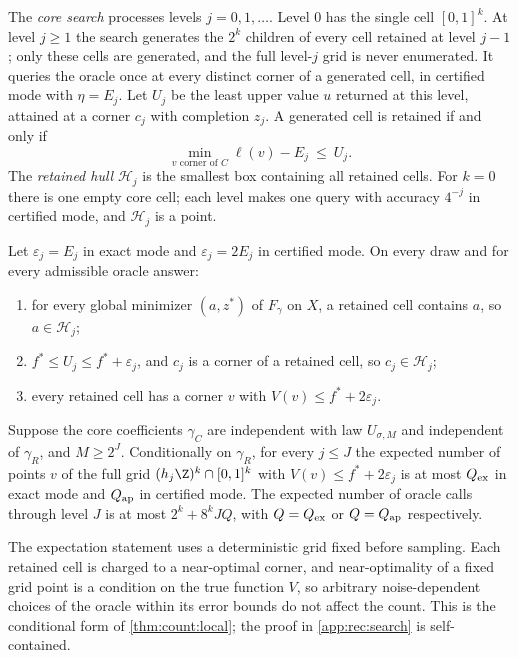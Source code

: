 The \emph{core search} processes levels $j=0,1,\ldots$. Level $0$ has the
single cell $[0,1]^k$. At level $j\ge1$ the search generates the $2^k$
children of every cell retained at level $j-1$; only these cells are
generated, and the full level-$j$ grid is never enumerated. It queries the
oracle once at every distinct corner of a generated cell, in certified mode
with $\eta=E_j$. Let $U_j$ be the least upper value $u$ returned at this
level, attained at a corner $c_j$ with completion $z_j$. A generated cell is
retained if and only if
\begin{equation}\label{eq:rec:retain}
 \min_{v\text{ corner of }C}\ell(v)-E_j\ \le\ U_j .
\end{equation}
The \emph{retained hull} $\mathcal H_j$ is the smallest box containing all
retained cells. For $k=0$ there is one empty core cell; each level makes one
query with accuracy $4^{-j}$ in certified mode, and $\mathcal H_j$ is a point.

\begin{proposition}\label{prop:rec:search}
Let $\varepsilon_j=E_j$ in exact mode and $\varepsilon_j=2E_j$ in certified
mode. On every draw and for every admissible oracle answer:
\begin{enumerate}[label=(\alph*)]
\item for every global minimizer $(a,z^*)$ of $F_\gamma$ on $X$, a retained
cell contains $a$, so $a\in\mathcal H_j$;
\item $f^*\le U_j\le f^*+\varepsilon_j$, and $c_j$ is a corner of a retained
cell, so $c_j\in\mathcal H_j$;
\item every retained cell has a corner $v$ with $V(v)\le f^*+2\varepsilon_j$.
\end{enumerate}
Suppose the core coefficients $\gamma_C$ are independent with law
$U_{\sigma,M}$ and independent of $\gamma_R$, and $M\ge2^J$. Conditionally
on $\gamma_R$, for every $j\le J$ the expected number of points $v$ of the
full grid $(h_j\Z)^k\cap[0,1]^k$ with $V(v)\le f^*+2\varepsilon_j$ is at most
$Q_{\rm ex}$ in exact mode and $Q_{\rm ap}$ in certified mode. The expected
number of oracle calls through level $J$ is at most $2^k+8^kJQ$, with
$Q=Q_{\rm ex}$ or $Q=Q_{\rm ap}$ respectively.
\end{proposition}

The expectation statement uses a deterministic grid fixed before sampling.
Each retained cell is charged to a near-optimal corner, and near-optimality
of a fixed grid point is a condition on the true function $V$, so arbitrary
noise-dependent choices of the oracle within its error bounds do not affect
the count. This is the conditional form of \cref{thm:count:local}; the proof
in \cref{app:rec:search} is self-contained.

